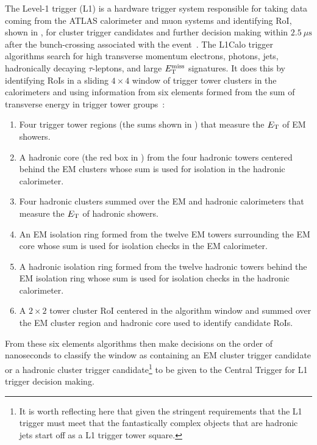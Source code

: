 The Level-1 trigger (L1) is a hardware trigger system responsible for taking data coming from the ATLAS calorimeter and muon systems and identifying \gls{RoI}, shown in , for cluster trigger candidates and further decision making within $2.5~\mu\mathrm{s}$ after the bunch-crossing associated with the event~\cite{PERF-2007-01}.
The L1Calo trigger algorithms search for high transverse momentum electrons, photons, jets, hadronically decaying $\tau$-leptons, and large $E_{\mathrm{T}}^{\mathrm{miss}}$ signatures.
It does this by identifying RoIs in a sliding $4 \times 4$ window of trigger tower clusters in the calorimeters and using information from six elements formed from the sum of transverse energy in trigger tower groups~\cite{Eisenhandler:792528}:
\begin{enumerate}
 \item Four trigger tower regions (the sums shown in ) that measure the $E_{\mathrm{T}}$ of EM showers.
 \item A hadronic core (the red box in ) from the four hadronic towers centered behind the EM clusters whose sum is used for isolation in the hadronic calorimeter.
 \item Four hadronic clusters summed over the EM and hadronic calorimeters that measure the $E_{\mathrm{T}}$ of hadronic showers.
 \item An EM isolation ring formed from the twelve EM towers surrounding the EM core whose sum is used for isolation checks in the EM calorimeter.
 \item A hadronic isolation ring formed from the twelve hadronic towers behind the EM isolation ring whose sum is used for isolation checks in the hadronic calorimeter.
 \item A $2 \times 2 $ tower cluster RoI centered in the algorithm window and summed over the EM cluster region and hadronic core used to identify candidate RoIs.
\end{enumerate}

From these six elements algorithms then make decisions on the order of nanoseconds to classify the window as containing an EM cluster trigger candidate or a hadronic cluster trigger candidate\footnote{It is worth reflecting here that given the stringent requirements that the L1 trigger must meet that the fantastically complex objects that are hadronic jets start off as a L1 trigger tower square.} to be given to the Central Trigger for L1 trigger decision making.

